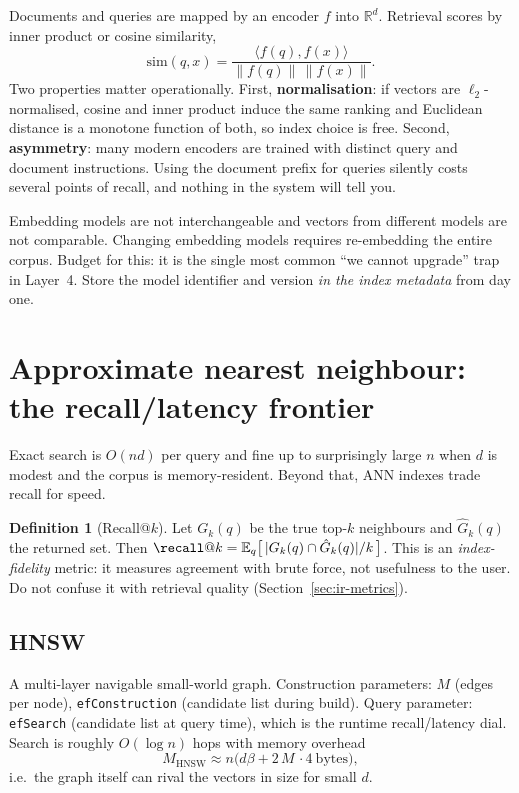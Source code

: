 \documentclass[11pt,twoside,openright]{book}
\theoremstyle{definition}
\newtheorem{definition}{Definition}[chapter]
\theoremstyle{plain}
\theoremstyle{remark}
\newcommand{\code}[1]{\texttt{\small #1}}
\newcommand{\term}[1]{\textbf{#1}}
\newcommand{\E}{\mathbb{E}}
\newcommand{\R}{\mathbb{R}}
\begin{document}
Documents and queries are mapped by an encoder $f$ into $\R^d$. Retrieval scores
by inner product or cosine similarity,
\[
  \mathrm{sim}(q,x) = \frac{\langle f(q), f(x)\rangle}{\|f(q)\|\,\|f(x)\|}.
\]
Two properties matter operationally. First, \term{normalisation}: if vectors are
$\ell_2$-normalised, cosine and inner product induce the same ranking and
Euclidean distance is a monotone function of both, so index choice is free.
Second, \term{asymmetry}: many modern encoders are trained with distinct query
and document instructions. Using the document prefix for queries silently costs
several points of recall, and nothing in the system will tell you.

\begin{caution}
Embedding models are not interchangeable and vectors from different models are
not comparable. Changing embedding models requires re-embedding the entire
corpus. Budget for this: it is the single most common ``we cannot upgrade''
trap in Layer~4. Store the model identifier and version \emph{in the index
metadata} from day one.
\end{caution}

\section{Approximate nearest neighbour: the recall/latency frontier}

Exact search is $O(nd)$ per query and fine up to surprisingly large $n$ when $d$
is modest and the corpus is memory-resident. Beyond that, ANN indexes trade
recall for speed.

\begin{definition}[Recall@$k$]
Let $G_k(q)$ be the true top-$k$ neighbours and $\hat{G}_k(q)$ the returned set.
Then
$\recall@k = \E_q\bigl[\,|G_k(q)\cap \hat{G}_k(q)|/k\,\bigr]$.
This is an \emph{index-fidelity} metric: it measures agreement with brute force,
not usefulness to the user. Do not confuse it with retrieval quality
(Section~\ref{sec:ir-metrics}).
\end{definition}

\subsection{HNSW}

A multi-layer navigable small-world graph. Construction parameters: $M$ (edges
per node), \code{efConstruction} (candidate list during build). Query parameter:
\code{efSearch} (candidate list at query time), which is the runtime
recall/latency dial. Search is roughly $O(\log n)$ hops with memory overhead
\begin{equation}
  M_{\text{HNSW}} \approx n\bigl(d\beta + 2\,M\,\cdot 4\ \text{bytes}\bigr),
\end{equation}
i.e.\ the graph itself can rival the vectors in size for small $d$.
\end{document}
